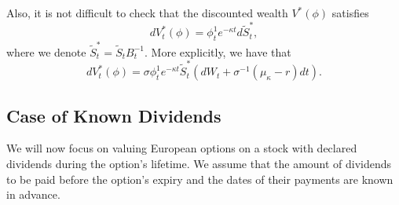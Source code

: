 Also, it is not difficult to check that the discounted wealth \(V^*(\phi)\) satisfies
\begin{equation}
	dV^*_t(\phi) = \phi^1_t e^{-\kappa t} d\tilde{S}^*_t,
	\label{eq:DiscountedWealthSimple}
\end{equation}
where we denote \(\tilde{S}^*_t = \tilde{S}_t B_t^{-1}\). More explicitly, we have that
\begin{equation}
	dV^*_t(\phi) = \sigma \phi^1_t e^{-\kappa t} \tilde{S}^*_t (dW_t + \sigma^{-1}(\mu_\kappa - r)dt).
	\label{eq:DiscountedWealthExplicit}
\end{equation}

\subsection{Case of Known Dividends}
We will now focus on valuing European options on a stock with declared dividends during the option’s lifetime. We assume that the amount of dividends to be paid before the option’s expiry and the dates of their payments are known in advance.

